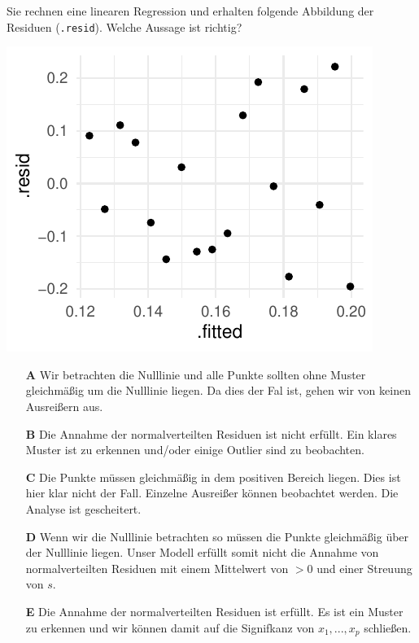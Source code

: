 \documentclass[a4paper, 9pt]{scrartcl}\usepackage[]{graphicx}\usepackage[]{xcolor}
\makeatletter
\def\maxwidth{ %
  \ifdim\Gin@nat@width>\linewidth
    \linewidth
  \else
    \Gin@nat@width
  \fi
}
\makeatother
\begin{document}
Sie rechnen eine linearen Regression und erhalten folgende Abbildung der Residuen (\texttt{.resid}). Welche Aussage ist richtig?



{\centering \includegraphics[width=\maxwidth]{img/mc-regression-06-a-1} 

}







\begin{enumerate}
\item [\textbf{A} \msquare] Wir betrachten die Nulllinie und alle Punkte sollten ohne Muster gleichmäßig um die Nulllinie liegen. Da dies der Fal ist, gehen wir von keinen Ausreißern aus.
\item [\textbf{B} \msquare] Die Annahme der normalverteilten Residuen ist nicht erfüllt. Ein klares Muster ist zu erkennen und/oder einige Outlier sind zu beobachten.
\item [\textbf{C} \msquare] Die Punkte müssen gleichmäßig in dem positiven Bereich liegen. Dies ist hier klar nicht der Fall. Einzelne Ausreißer können beobachtet werden. Die Analyse ist gescheitert.
\item [\textbf{D} \msquare] Wenn wir die Nulllinie betrachten so müssen die Punkte gleichmäßig über der Nulllinie liegen. Unser Modell erfüllt somit nicht die Annahme von normalverteilten Residuen mit einem Mittelwert von $>0$ und einer Streuung von $s$.
\item [\textbf{E} \msquare] Die Annahme der normalverteilten Residuen ist erfüllt. Es ist ein Muster zu erkennen und wir können damit auf die Signifkanz von $x_1, ..., x_p$ schließen.
\end{enumerate}
\end{document}
